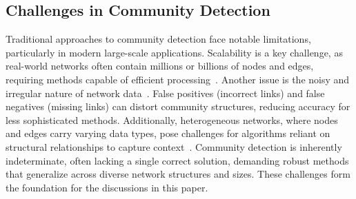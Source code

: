\documentclass{article}
\begin{document}
\subsection{Challenges in Community Detection}
Traditional approaches to community detection face notable limitations, particularly in modern large-scale applications. Scalability is a key challenge, as real-world networks often contain millions or billions of nodes and edges, requiring methods capable of efficient processing~\cite{7161493}. Another issue is the noisy and irregular nature of network data~\cite{10.1145/2488388.2488483}. False positives (incorrect links) and false negatives (missing links) can distort community structures, reducing accuracy for less sophisticated methods. Additionally, heterogeneous networks, where nodes and edges carry varying data types, pose challenges for algorithms reliant on structural relationships to capture context~\cite{7536145}. Community detection is inherently indeterminate, often lacking a single correct solution, demanding robust methods that generalize across diverse network structures and sizes. These challenges form the foundation for the discussions in this paper.
\end{document}
